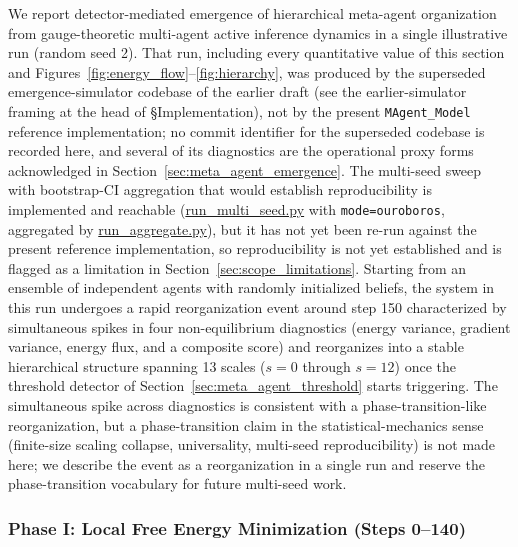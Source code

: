\documentclass[11pt]{article}
\begin{document}
We report detector-mediated emergence of hierarchical meta-agent organization from gauge-theoretic multi-agent active inference dynamics in a single illustrative run (random seed 2). That run, including every quantitative value of this section and Figures~\ref{fig:energy_flow}--\ref{fig:hierarchy}, was produced by the superseded emergence-simulator codebase of the earlier draft (see the earlier-simulator framing at the head of §Implementation), not by the present \texttt{MAgent\_Model} reference implementation; no commit identifier for the superseded codebase is recorded here, and several of its diagnostics are the operational proxy forms acknowledged in Section~\ref{sec:meta_agent_emergence}. The multi-seed sweep with bootstrap-CI aggregation that would establish reproducibility is implemented and reachable (\url{run_multi_seed.py} with \texttt{mode=\textquotesingle ouroboros\textquotesingle}, aggregated by \url{run_aggregate.py}), but it has not yet been re-run against the present reference implementation, so reproducibility is not yet established and is flagged as a limitation in Section~\ref{sec:scope_limitations}. Starting from an ensemble of independent agents with randomly initialized beliefs, the system in this run undergoes a rapid reorganization event around step 150 characterized by simultaneous spikes in four non-equilibrium diagnostics (energy variance, gradient variance, energy flux, and a composite score) and reorganizes into a stable hierarchical structure spanning 13 scales ($s = 0$ through $s = 12$) once the threshold detector of Section~\ref{sec:meta_agent_threshold} starts triggering. The simultaneous spike across diagnostics is consistent with a phase-transition-like reorganization, but a phase-transition claim in the statistical-mechanics sense (finite-size scaling collapse, universality, multi-seed reproducibility) is not made here; we describe the event as a reorganization in a single run and reserve the phase-transition vocabulary for future multi-seed work.

\subsubsection{Phase I: Local Free Energy Minimization (Steps 0--140)}
\end{document}
